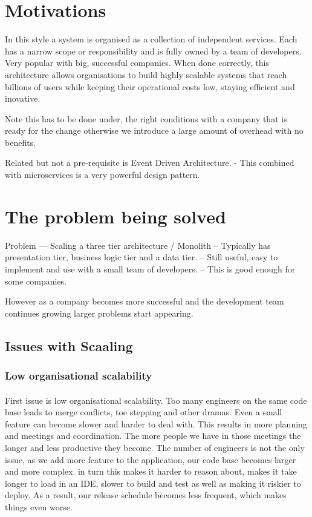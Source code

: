 \section{Motivations}
In this style a system is organised as a collection of independent services.
Each has a narrow scope or responsibility and is fully owned by a team of developers.
Very popular with big, successful companies.
When done correctly, this architecture allows organisations to build highly scalable systems that reach billions of users while keeping their operational costs low, staying efficient and inovative.

Note this has to be done under, the right conditions with a company that is ready for the change otherwise we introduce a large amount of overhead with no benefits.

Related but not a pre-requisite is Event Driven Architecture.
- This combined with microservices is a very powerful design pattern.

\section{The problem being solved}
Problem --- Scaling a three tier architecture / Monolith
-- Typically has presentation tier, business logic tier and a data tier.
-- Still useful, easy to implement and use with a small team of developers.
-- This is good enough for some companies.

However as a company becomes more successful and the development team continues growing larger problems start appearing.

\subsection{Issues with Scaaling}

\subsubsection{Low organisational scalability}

\paragraph{}
First issue is low organisational scalability.
Too many engineers on the same code base leads to merge conflicts, toe stepping and other dramas.
Even a small feature can become slower and harder to deal with.
This results in more planning and meetings and coordination.
The more people we have in those meetings the longer and less productive they become.
The number of engineers is not the only issue, as we add more feature to the application, our code base becomes larger and more complex.
in turn this makes it harder to reason about, makes it take longer to load in an IDE, slower to build and test as well as making it riskier to deploy.
As a result, our release schedule becomes less frequent, which makes things even worse.

